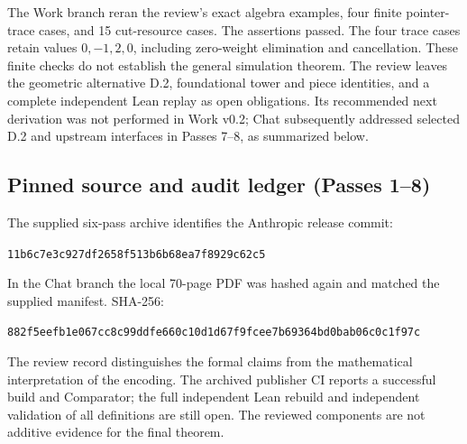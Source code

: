 \documentclass[11pt,letterpaper]{article}
\begin{document}
The Work branch reran the review's exact algebra examples, four finite pointer-trace cases, and 15 cut-resource cases. The assertions passed. The four trace cases retain values $0,-1,2,0$, including zero-weight elimination and cancellation. These finite checks do not establish the general simulation theorem. The review leaves the geometric alternative D.2, foundational tower and piece identities, and a complete independent Lean replay as open obligations. Its recommended next derivation was not performed in Work v0.2; Chat subsequently addressed selected D.2 and upstream interfaces in Passes 7--8, as summarized below.\cite{internalvp}

\subsection{Pinned source and audit ledger (Passes 1--8)}
The supplied six-pass archive \cite{internalvp} identifies the Anthropic release commit:
\begin{center}\small\texttt{11b6c7e3c927df2658f513b6b68ea7f8929c62c5}\end{center} In the Chat branch the local 70-page PDF was hashed again and matched the supplied manifest. SHA-256:
\begin{center}\small\texttt{882f5eefb1e067cc8c99ddfe660c10d1d}\newline\texttt{67f9fcee7b69364bd0bab06c0c1f97c}\end{center}
The review record distinguishes the formal claims from the mathematical interpretation of the encoding. The archived publisher CI reports a successful build and Comparator; the full independent Lean rebuild and independent validation of all definitions are still open. The reviewed components are not additive evidence for the final theorem.
\end{document}

